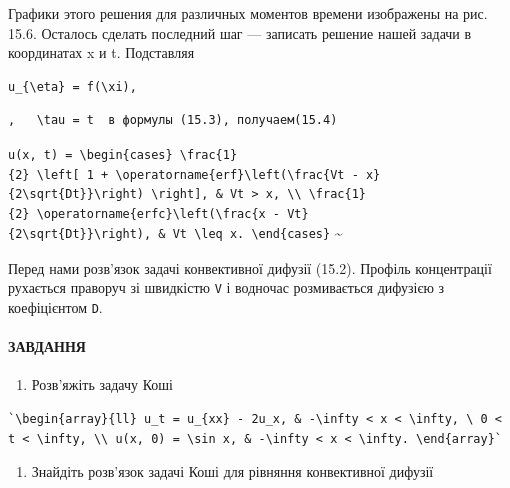 \documentclass[
  ukrainian,
]{article}
\providecommand{\tightlist}{%
  \setlength{\itemsep}{0pt}\setlength{\parskip}{0pt}}
\begin{document}
Графики этого решения для различных моментов времени изображены на рис.
15.6. Осталось сделать последний шаг --- записать решение нашей задачи в
координатах x и t. Подставляя

\begin{verbatim}
u_{\eta} = f(\xi),
\end{verbatim}

\begin{verbatim}
,   \tau = t  в формулы (15.3), получаем(15.4)
\end{verbatim}

\texttt{u(x,\ t)\ =\ \textbackslash{}begin\{cases\}\ \textbackslash{}frac\{1\}\{2\}\ \textbackslash{}left{[}\ 1\ +\ \textbackslash{}operatorname\{erf\}\textbackslash{}left(\textbackslash{}frac\{Vt\ -\ x\}\{2\textbackslash{}sqrt\{Dt\}\}\textbackslash{}right)\ \textbackslash{}right{]},\ \&\ Vt\ \textgreater{}\ x,\ \textbackslash{}\textbackslash{}\ \textbackslash{}frac\{1\}\{2\}\ \textbackslash{}operatorname\{erfc\}\textbackslash{}left(\textbackslash{}frac\{x\ -\ Vt\}\{2\textbackslash{}sqrt\{Dt\}\}\textbackslash{}right),\ \&\ Vt\ \textbackslash{}leq\ x.\ \textbackslash{}end\{cases\}}
\textsubscript{}\textasciitilde{}

Перед нами розв'язок задачі конвективної дифузії (15.2). Профіль
концентрації рухається праворуч зі швидкістю \texttt{V} і водночас
розмивається дифузією з коефіцієнтом \texttt{D}.

\paragraph{ЗАВДАННЯ}\label{ux437ux430ux432ux434ux430ux43dux43dux44f}

\begin{enumerate}
\def\labelenumi{\arabic{enumi}.}
\tightlist
\item
  Розв'яжіть задачу Коші
\end{enumerate}

\begin{verbatim}
`\begin{array}{ll} u_t = u_{xx} - 2u_x, & -\infty < x < \infty, \ 0 < t < \infty, \\ u(x, 0) = \sin x, & -\infty < x < \infty. \end{array}`
\end{verbatim}

\begin{enumerate}
\def\labelenumi{\arabic{enumi}.}
\setcounter{enumi}{1}
\tightlist
\item
  Знайдіть розв'язок задачі Коші для рівняння конвективної дифузії
\end{enumerate}
\end{document}
